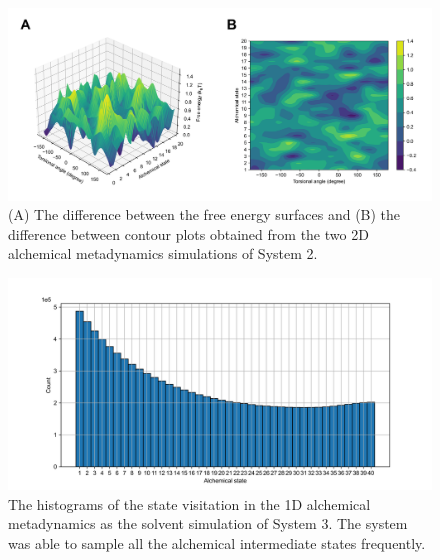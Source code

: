 \documentclass[journal=jacsat,manuscript=article]{achemso}
\begin{document}
\renewcommand{\thefigure}{S\arabic{figure}}
\begin{figure}[H]
    \centering
    \includegraphics[width=\textwidth]{Figures/sys2_fes_contour_diff_annotated.png}   
    \caption{(A) The difference between the free energy surfaces and (B) the difference between contour plots obtained from the two 2D alchemical metadynamics simulations of System 2.}
    \label{sys2_fes_diff}
\end{figure}

\renewcommand{\thefigure}{S\arabic{figure}}
\begin{figure}[H]
    \centering
    \includegraphics[width=\textwidth]{Figures/lambda_hist.png}   
    \caption{The histograms of the state visitation in the 1D alchemical metadynamics as the solvent simulation of System 3. The system was able to sample all the alchemical intermediate states frequently.}
    \label{sys3_1D_hist}
\end{figure}


\clearpage

\end{document}

